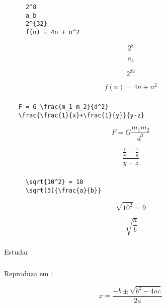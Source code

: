 \begin{frame}[fragile]
  \frametitle{}
  \Large

  \begin{minipage}{.65\textwidth}
    \begin{verbatim}
      2^8
      a_b
      2^{32}
      f(n) = 4n + n^2
    \end{verbatim}
  \end{minipage}
  \begin{minipage}{.25\textwidth}
    \[ 2^8 \]

    \[ a_b \]

    \[ 2^{32} \]

    \[ f(n) = 4n + n^2 \]
  \end{minipage}
\end{frame}

\begin{frame}[fragile]
  \frametitle{}
  \Large
  \begin{verbatim}
    F = G \frac{m_1 m_2}{d^2}
    \frac{\frac{1}{x}+\frac{1}{y}}{y-z}
  \end{verbatim}

  \[ F = G \frac{m_1 m_2}{d^2} \]

  \[ \frac{\frac{1}{x}+\frac{1}{y}}{y-z} \]
\end{frame}

\begin{frame}[fragile]
  \frametitle{}
  \Large
  \begin{minipage}{.55\textwidth}
    \begin{verbatim}
      \sqrt{10^2} = 10
      \sqrt[3]{\frac{a}{b}}
    \end{verbatim}
  \end{minipage}
  \begin{minipage}{.35\textwidth}
    \[ \sqrt{10^2} = 9 \]

    \[ \sqrt[3]{\frac{a}{b}} \]
  \end{minipage}
\end{frame}

\begin{frame}
  \frametitle{}
  \Huge
  Estudar 
\end{frame}

\begin{frame}
  \frametitle{}
  \Large
  Reproduza em :

  \huge
  \begin{equation}
    x = \frac{-b \pm \sqrt{b^2 - 4ac}}{2a}
  \end{equation}
\end{frame}

